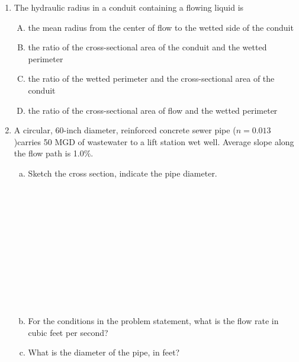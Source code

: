 \documentclass[11pt]{article}
\begin{document}
\begin{enumerate}
\item  The hydraulic radius in a conduit containing a flowing liquid is
\begin{enumerate} [(A)]
\item	the mean radius from the center of flow to the wetted side of the conduit
\item	the ratio of the cross-sectional area of the conduit and the wetted perimeter
\item	the ratio of the wetted perimeter and the cross-sectional area of the conduit
\item	the ratio of the cross-sectional area of flow and the wetted perimeter
\end{enumerate}
%
%
%

\item A circular, 60-inch diameter, reinforced concrete sewer pipe ($n = 0.013$ )carries 50 MGD of wastewater to a lift station wet well.   Average slope along the flow path is 1.0\%.

\begin{enumerate} [a)]
\item	Sketch the cross section, indicate the pipe diameter.
~\\
~\\
~\\
~\\
~\\
~\\
~\\
~\\
~\\
~\\
~\\
~\\
\item For the conditions in the problem statement, what is the flow rate in cubic feet per second?
~\\

\item What is the diameter of the pipe, in feet?
~\\


\end{enumerate}
\end{enumerate}
\end{document}
